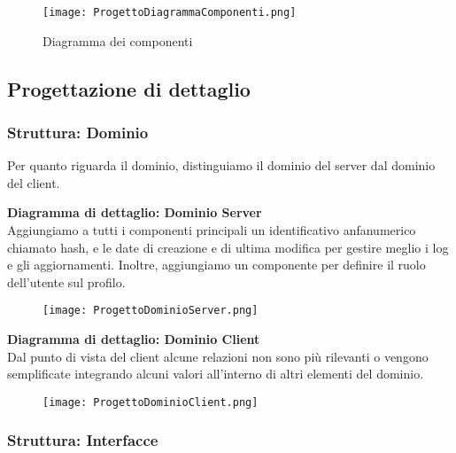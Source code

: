 \begin{figure}[h!]
    \begin{center}
        \texttt{[image: ProgettoDiagrammaComponenti.png]}
        \caption{Diagramma dei componenti}
    \end{center}
\end{figure}

\newpage

\subsection{Progettazione di dettaglio}

\subsubsection{Struttura: Dominio}

Per quanto riguarda il dominio, distinguiamo il dominio del server dal dominio del client.

\vspace{1em}

\textbf{Diagramma di dettaglio: Dominio Server}\\
Aggiungiamo a tutti i componenti principali un identificativo anfanumerico chiamato hash,
e le date di creazione e di ultima modifica per gestire meglio i log e gli aggiornamenti.
Inoltre, aggiungiamo un componente per definire il ruolo dell'utente sul profilo.
\begin{figure}[h!]
    \begin{center}
        \texttt{[image: ProgettoDominioServer.png]}
    \end{center}
\end{figure}

\newpage

\textbf{Diagramma di dettaglio: Dominio Client}\\
Dal punto di vista del client alcune relazioni non sono più rilevanti o vengono semplificate integrando alcuni valori all'interno di altri elementi del dominio.
\begin{figure}[h!]
    \begin{center}
        \texttt{[image: ProgettoDominioClient.png]}
    \end{center}
\end{figure}
\clearpage

\subsubsection{Struttura: Interfacce}

